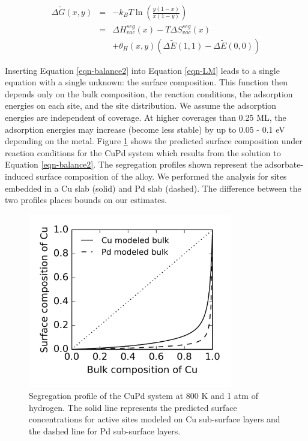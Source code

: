 \documentclass[12pt,oneside]{cmuthesis}
\begin{document}
\begin{eqnarray}
\Delta \widetilde{G} (x,y) &=& -k_{B}T \ln\left(\frac{y(1-x)}{x(1-y)}\right) \nonumber\\
 &=&  \Delta H^{seg}_{vac} (x) - T \Delta S^{seg}_{vac} (x) \\
 & & + \theta_{H} (x,y) \left(\Delta \widetilde{E}(1,1) - \Delta \widetilde{E}(0,0)\right) \nonumber
\label{eqn-balance2}
\end{eqnarray}

Inserting Equation \eqref{eqn-balance2} into Equation \eqref{eqn-LM} leads to a single equation with a single unknown: the surface composition. This function then depends only on the bulk composition, the reaction conditions, the adsorption energies on each site, and the site distribution. We assume the adsorption energies are independent of coverage. At higher coverages than 0.25 ML, the adsorption energies may increase (become less stable) by up to 0.05 - 0.1 eV depending on the metal. Figure \ref{fig-seg} shows the predicted surface composition under reaction conditions for the CuPd system which results from the solution to Equation \eqref{eqn-balance2}. The segregation profiles shown represent the adsorbate-induced surface composition of the alloy. We performed the analysis for sites embedded in a Cu slab (solid) and Pd slab (dashed). The difference between the two profiles places bounds on our estimates.

\begin{figure}[h]
\centering
\includegraphics[width=3.5in]{./images/segtot.png}
\caption{Segregation profile of the CuPd system at 800 K and 1 atm of hydrogen. The solid line represents the predicted surface concentrations for active sites modeled on Cu sub-surface layers and the dashed line for Pd sub-surface layers. \label{fig-seg}}
\end{figure}
\end{document}
